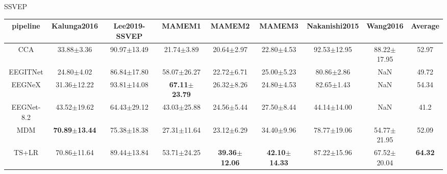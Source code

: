 \caption{SSVEP}{}
\label{tab:SSVEP_agg_dataset}
\begin{adjustbox}{scale=.7}
\begin{tabular}{c|ccccccc|c}
\toprule
    \rowcolor{YellowOrange!50} pipeline &                       Kalunga2016 &                    Lee2019-SSVEP &                            MAMEM1 &                            MAMEM2 &                            MAMEM3 &                    Nakanishi2015 &        Wang2016 &        Average \\
    \hline
    \rowcolor{YellowOrange!10} CCA &                    33.88$\pm$3.36 &                  90.97$\pm$13.49 &                    21.74$\pm$3.89 &                    20.64$\pm$2.97 &                    22.80$\pm$4.53 &                  92.53$\pm$12.95 & 88.22$\pm$17.95 &          52.97 \\
    \rowcolor{YellowOrange!20} EEGITNet &                    24.80$\pm$4.02 &                  86.84$\pm$17.80 &                   58.07$\pm$26.27 &                    22.72$\pm$6.71 &                    25.00$\pm$5.23 &                   80.86$\pm$2.86 &             NaN &          49.72 \\
    \rowcolor{YellowOrange!10} EEGNeX &                   31.36$\pm$12.22 &                  93.81$\pm$14.08 & \textbf{67.11}$\pm$\textbf{23.79} &                    26.32$\pm$8.26 &                    24.80$\pm$4.53 &                   82.65$\pm$1.43 &             NaN &          54.34 \\
    \rowcolor{YellowOrange!20} EEGNet-8.2 &                   43.52$\pm$19.62 &                  64.43$\pm$29.12 &                   43.03$\pm$25.88 &                    24.56$\pm$5.44 &                    27.50$\pm$8.44 &                  44.14$\pm$14.00 &             NaN &           41.2 \\
    \rowcolor{YellowOrange!10} MDM & \textbf{70.89}$\pm$\textbf{13.44} &                  75.38$\pm$18.38 &                   27.31$\pm$11.64 &                    23.12$\pm$6.29 &                    34.40$\pm$9.96 &                  78.77$\pm$19.06 & 54.77$\pm$21.95 &          52.09 \\
    \rowcolor{YellowOrange!20} TS+LR &                   70.86$\pm$11.64 &                  89.44$\pm$13.84 &                   53.71$\pm$24.25 & \textbf{39.36}$\pm$\textbf{12.06} & \textbf{42.10}$\pm$\textbf{14.33} &                  87.22$\pm$15.96 & 67.52$\pm$20.04 & \textbf{64.32} \\

\end{tabular}
\end{adjustbox}
